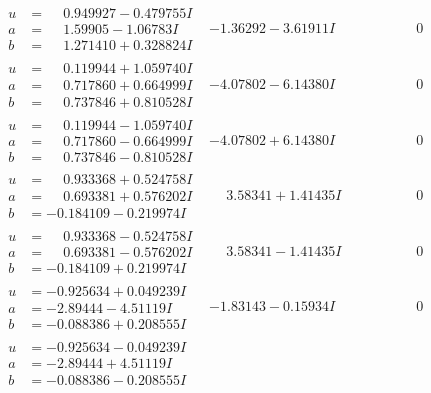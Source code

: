 \documentclass[1p]{elsarticle_modified}
\theoremstyle{definition}
\begin{document}
$$\begin{array}{c|c|c}
\begin{aligned}
u &= \phantom{-}0.949927 - 0.479755 I \\
a &= \phantom{-}1.59905 - 1.06783 I \\
b &= \phantom{-}1.271410 + 0.328824 I\end{aligned}
 & -1.36292 - 3.61911 I & \phantom{-0.000000 } 0 \\ \hline\begin{aligned}
u &= \phantom{-}0.119944 + 1.059740 I \\
a &= \phantom{-}0.717860 + 0.664999 I \\
b &= \phantom{-}0.737846 + 0.810528 I\end{aligned}
 & -4.07802 - 6.14380 I & \phantom{-0.000000 } 0 \\ \hline\begin{aligned}
u &= \phantom{-}0.119944 - 1.059740 I \\
a &= \phantom{-}0.717860 - 0.664999 I \\
b &= \phantom{-}0.737846 - 0.810528 I\end{aligned}
 & -4.07802 + 6.14380 I & \phantom{-0.000000 } 0 \\ \hline\begin{aligned}
u &= \phantom{-}0.933368 + 0.524758 I \\
a &= \phantom{-}0.693381 + 0.576202 I \\
b &= -0.184109 - 0.219974 I\end{aligned}
 & \phantom{-}3.58341 + 1.41435 I & \phantom{-0.000000 } 0 \\ \hline\begin{aligned}
u &= \phantom{-}0.933368 - 0.524758 I \\
a &= \phantom{-}0.693381 - 0.576202 I \\
b &= -0.184109 + 0.219974 I\end{aligned}
 & \phantom{-}3.58341 - 1.41435 I & \phantom{-0.000000 } 0 \\ \hline\begin{aligned}
u &= -0.925634 + 0.049239 I \\
a &= -2.89444 - 4.51119 I \\
b &= -0.088386 + 0.208555 I\end{aligned}
 & -1.83143 - 0.15934 I & \phantom{-0.000000 } 0 \\ \hline\begin{aligned}
u &= -0.925634 - 0.049239 I \\
a &= -2.89444 + 4.51119 I \\
b &= -0.088386 - 0.208555 I\end{aligned}

\end{array}$$
\end{document}

